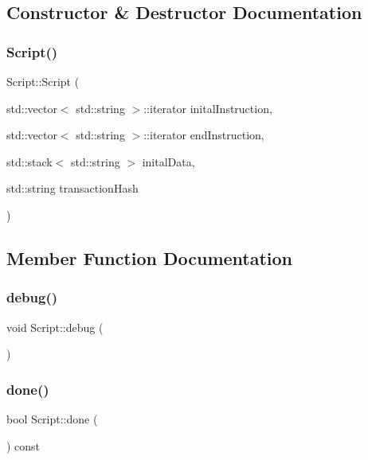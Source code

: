 \subsection{Constructor \& Destructor Documentation}
\mbox{\label{classScript_ac5dfef3a38ce09aa3d664b041b4b47e1}} 
\subsubsection{\texorpdfstring{Script()}{Script()}}
{\footnotesize\ttfamily Script\+::\+Script (\begin{DoxyParamCaption}\item[{std\+::vector$<$ std\+::string $>$\+::iterator}]{inital\+Instruction,  }\item[{std\+::vector$<$ std\+::string $>$\+::iterator}]{end\+Instruction,  }\item[{std\+::stack$<$ std\+::string $>$}]{inital\+Data,  }\item[{std\+::string}]{transaction\+Hash }\end{DoxyParamCaption})}



\subsection{Member Function Documentation}
\mbox{\label{classScript_aeabf9b6665b69309c6e825606d19202d}} 
\subsubsection{\texorpdfstring{debug()}{debug()}}
{\footnotesize\ttfamily void Script\+::debug (\begin{DoxyParamCaption}{ }\end{DoxyParamCaption})}

\mbox{\label{classScript_ab5fb80fb997e4d8172dd418037a7bc0b}} 
\subsubsection{\texorpdfstring{done()}{done()}}
{\footnotesize\ttfamily bool Script\+::done (\begin{DoxyParamCaption}{ }\end{DoxyParamCaption}) const}

